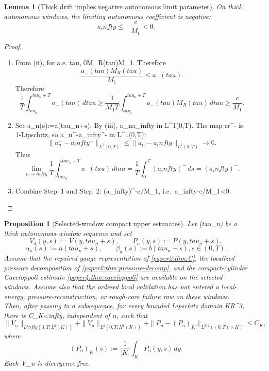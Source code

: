 \documentclass[11pt]{amsart}
\def\({}%
\def\){}%
\def\mathbb#1{#1}%
\def\tau{tau}%
\def\infty{infty}%
\theoremstyle{plain}
\newtheorem{lemma}[lemma]{Lemma}
\newtheorem{proposition}[proposition]{Proposition}
\theoremstyle{definition}
\theoremstyle{remark}
\begin{document}
\begin{lemma}[Thick drift implies negative autonomous limit parameter]\label{paper5:lem:negative-parameter}
On thick autonomous windows, the limiting autonomous coefficient is negative:
\[
  a_\infty\le-\frac{c}{M_1}<0.
\]
\end{lemma}

\begin{proof}
\begin{enumerate}[label=(\arabic*)]
  \item From (ii), for a.e. \(\tau\in[\tau_n,\tau_n+T]\),
  \(0\le M_R(\tau)\le M_1\).  Therefore
  \[
    \frac{a_-(\tau)M_R(\tau)}{M_1}
    \le a_-(\tau).
  \]
  Therefore
  \[
    \frac1T\int_{\tau_n}^{\tau_n+T}a_-(\tau)
    \,d\tau
    \ge \frac1{M_1T}\int_{\tau_n}^{\tau_n+T}a_-(\tau)M_R(\tau)
    \,d\tau
    \ge \frac{c}{M_1}.
  \]

  \item Set \(a_n(s):=a(\tau_n+s)\).  By (iii), \(a_n\to a_\infty\) in
  \(L^1(0,T)\). The map \(r\mapsto r^-\) is 1-Lipschitz, so
  \(a_n^-\to a_\infty^-\) in \(L^1(0,T)\):
  \[
    \|a_n^--a_\infty^-\|_{L^1(0,T)}\le
    \|a_n-a_\infty\|_{L^1(0,T)}\to0.
  \]
  Thus
  \[
  \lim_{n\to\infty}\frac1T\int_{\tau_n}^{\tau_n+T}a_-(\tau)
    \,d\tau
    =\frac1T\int_0^T(a_\infty)^-
    \,ds=(a_\infty)^-.
  \]

  \item Combine Step~1 and Step~2:
  \((a_\infty)^-\ge c/M_1\), i.e.\ \(a_\infty\le-c/M_1<0\).
\end{enumerate}
\end{proof}

\begin{proposition}[Selected-window compact upper estimates]\label{paper5:prop:selected-window-suitable-estimates}
Let \((\tau_n)\) be a thick autonomous-window sequence and set
\[
  V_n(y,s):=V(y,\tau_n+s),\qquad
  P_n(y,s):=P(y,\tau_n+s),
\]
\[
  \alpha_n(s):=a(\tau_n+s),\qquad
  \beta_n(s):=b(\tau_n+s),
  s\in(0,T).
\]
Assume that the repaired-gauge representation of \cref{paper2:thm:C}, the
localized pressure decomposition of \cref{paper2:thm:pressure-decomp}, and the
compact-cylinder Caccioppoli estimate \cref{paper4:thm:caccioppoli} are
available on the selected windows.  Assume also that the ordered local
validation has not entered a local-energy, pressure-reconstruction, or
rough-core failure row on these windows.  Then, after passing to a subsequence,
for every bounded Lipschitz domain \(K\Subset\mathbb R^3\), there is
\(C_K<\infty\), independent of \(n\), such that
\[
  \|V_n\|_{L^\infty(0,T;L^2(K))}
  +\|V_n\|_{L^2(0,T;H^1(K))}
  +\|P_n-(P_n)_K\|_{L^{3/2}((0,T)\times K)}
  \le C_K,
\]
where
\[
  (P_n)_K(s):=\frac1{|K|}\int_KP_n(y,s)\,dy.
\]
Each \(V_n\) is divergence free.
\end{proposition}
\end{document}
